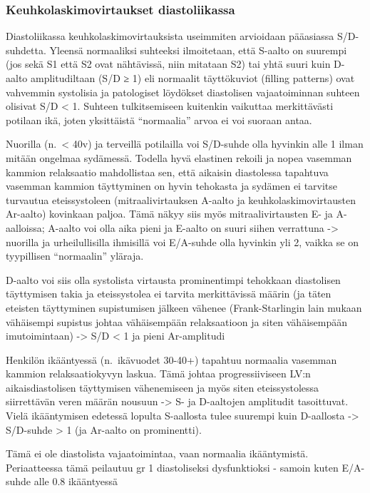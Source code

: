 \documentclass[
]{book}
\begin{document}
\subsubsection{Keuhkolaskimovirtaukset diastoliikassa}\label{keuhkolaskimovirtaukset-diastoliikassa}

Diastoliikassa keuhkolaskimovirtauksista useimmiten arvioidaan pääasiassa S/D-suhdetta. Yleensä normaaliksi suhteeksi ilmoitetaan, että S-aalto on suurempi (jos sekä S1 että S2 ovat nähtävissä, niin mitataan S2) tai yhtä suuri kuin D-aalto amplitudiltaan (S/D ≥ 1) eli normaalit täyttökuviot (filling patterns) ovat vahvemmin systolisia ja patologiset löydökset diastolisen vajaatoiminnan suhteen olisivat S/D \textless{} 1. Suhteen tulkitsemiseen kuitenkin vaikuttaa merkittävästi potilaan ikä, joten yksittäistä ``normaalia'' arvoa ei voi suoraan antaa.

Nuorilla (n.~\textless{} 40v) ja terveillä potilailla voi S/D-suhde olla hyvinkin alle 1 ilman mitään ongelmaa sydämessä. Todella hyvä elastinen rekoili ja nopea vasemman kammion relaksaatio mahdollistaa sen, että aikaisin diastolessa tapahtuva vasemman kammion täyttyminen on hyvin tehokasta ja sydämen ei tarvitse turvautua eteissystoleen (mitraalivirtauksen A-aalto ja keuhkolaskimovirtausten Ar-aalto) kovinkaan paljoa. Tämä näkyy siis myös mitraalivirtausten E- ja A-aalloissa; A-aalto voi olla aika pieni ja E-aalto on suuri siihen verrattuna -\textgreater{} nuorilla ja urheilullisilla ihmisillä voi E/A-suhde olla hyvinkin yli 2, vaikka se on tyypillisen ``normaalin'' yläraja.

D-aalto voi siis olla systolista virtausta prominentimpi tehokkaan diastolisen täyttymisen takia ja eteissystolea ei tarvita merkittävissä määrin (ja täten eteisten täyttyminen supistumisen jälkeen vähenee (Frank-Starlingin lain mukaan vähäisempi supistus johtaa vähäisempään relaksaatioon ja siten vähäisempään imutoimintaan) -\textgreater{} S/D \textless{} 1 ja pieni Ar-amplitudi

Henkilön ikääntyessä (n.~ikävuodet 30-40+) tapahtuu normaalia vasemman kammion relaksaatiokyvyn laskua. Tämä johtaa progressiiviseen LV:n aikaisdiastolisen täyttymisen vähenemiseen ja myös siten eteissystolessa siirrettävän veren määrän nousuun -\textgreater{} S- ja D-aaltojen amplitudit tasoittuvat. Vielä ikääntymisen edetessä lopulta S-aallosta tulee suurempi kuin D-aallosta -\textgreater{} S/D-suhde \textgreater{} 1 (ja Ar-aalto on prominentti).

Tämä ei ole diastolista vajaatoimintaa, vaan normaalia ikääntymistä. Periaatteessa tämä peilautuu gr 1 diastoliseksi dysfunktioksi - samoin kuten E/A-suhde alle 0.8 ikääntyessä
\end{document}
